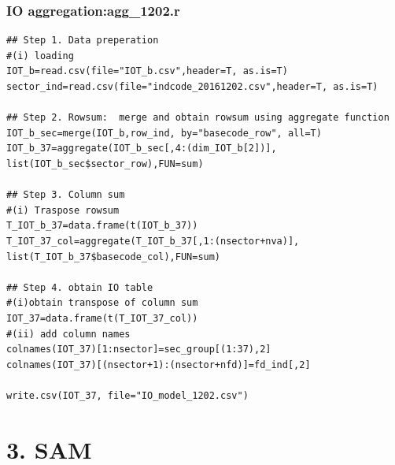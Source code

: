 \documentclass{beamer}
\begin{document}
\begin{frame}[fragile]
	\frametitle{IO aggregation:agg\_1202.r}
\begin{scriptsize}
	\begin{verbatim}
## Step 1. Data preperation
#(i) loading
IOT_b=read.csv(file="IOT_b.csv",header=T, as.is=T)
sector_ind=read.csv(file="indcode_20161202.csv",header=T, as.is=T)

## Step 2. Rowsum:  merge and obtain rowsum using aggregate function
IOT_b_sec=merge(IOT_b,row_ind, by="basecode_row", all=T)
IOT_b_37=aggregate(IOT_b_sec[,4:(dim_IOT_b[2])],
list(IOT_b_sec$sector_row),FUN=sum)

## Step 3. Column sum
#(i) Traspose rowsum 
T_IOT_b_37=data.frame(t(IOT_b_37))
T_IOT_37_col=aggregate(T_IOT_b_37[,1:(nsector+nva)],
list(T_IOT_b_37$basecode_col),FUN=sum)

## Step 4. obtain IO table
#(i)obtain transpose of column sum
IOT_37=data.frame(t(T_IOT_37_col))
#(ii) add column names
colnames(IOT_37)[1:nsector]=sec_group[(1:37),2]
colnames(IOT_37)[(nsector+1):(nsector+nfd)]=fd_ind[,2]

write.csv(IOT_37, file="IO_model_1202.csv")
	\end{verbatim}
\end{scriptsize}	
\end{frame}
\section{ 3. SAM}
\end{document}
